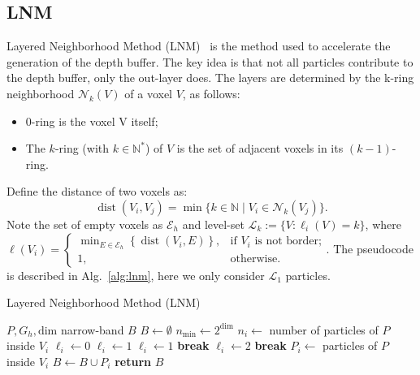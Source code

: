 \documentclass[sigconf]{acmart}
\begin{document}
\subsection{LNM}
Layered Neighborhood Method (LNM)~\cite{oliveira2022narrow} is the method used to accelerate the generation of the depth buffer. The key idea is that not all particles contribute to the depth buffer, only the out-layer does. The layers are determined by the k-ring neighborhood $\mathcal N_k(V)$ of a voxel $V$, as follows:
\begin{itemize}
    \item 0-ring is the voxel V itself;
    \item  The $k$-ring (with $k \in \mathbb N^*$) of $V$ is the set of adjacent voxels in its $(k-1)$-ring.
\end{itemize}
Define the distance of two voxels as:
\begin{equation}
\operatorname{dist}(V_i,V_j)=\min\{k\in\mathbb{N}\mid V_i\in\mathcal{N}_k(V_j)\}.
\end{equation}
Note the set of empty voxels as $\mathcal{E}_h$ and level-set $\mathcal L_k:=\{V:\ell_i(V)=k\}$, where $\ell(V_i)=\begin{cases}\min_{E\in\mathcal{E}_h}\left\{\operatorname{dist}(V_i,E)\right\},&\text{if }V_i\text{ is not border;}\\1,&\text{otherwise.}\end{cases}.$ The pseudocode is described in Alg.~\ref{alg:lnm}, here we only consider $\mathcal L_1$ particles.

\begin{algorithm}
\caption{Layered Neighborhood Method (LNM)}
\begin{algorithmic}[1]
\Require $P, G_h, \text{dim}$
\Ensure narrow-band $B$
\State $B \leftarrow \emptyset$
\State $n_{\text{min}} \leftarrow 2^{\text{dim}}$
    \State $n_i \leftarrow$ number of particles of $P$ inside $V_i$
    \State $\ell_i \leftarrow 0$
\EndFor
{} 
     
        \State $\ell_i \leftarrow 1$
    \Else
             
                \State $\ell_i \leftarrow 1$
                \State \textbf{break}
            \EndIf
        \EndFor
    \EndIf
\EndFor
{} 
                \State $\ell_i \leftarrow 2$
                \State \textbf{break}
            \EndIf
        \EndFor
    \EndIf
\EndFor
{}
        \State $P_i \leftarrow$ particles of $P$ inside $V_i$
        \State $B \leftarrow B \cup P_i$
    \EndIf
\EndFor
\State \textbf{return} $B$
\end{algorithmic}
\label{alg:lnm}
\end{algorithm}
\end{document}
